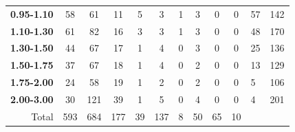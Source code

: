 \begin{table}
\begin{tabular}{r|cccccccccll}
\textbf{0.95-1.10}    & 58                          & 61                          & 11                          & 5                        & 3                          & 1                          & 3                          & 0                        & 0                          & 57                   & 142   \\
\textbf{1.10-1.30}    & 61                          & 82                          & 16                          & 3                        & 3                          & 1                          & 3                          & 0                        & 0                          & 48                   & 170   \\
\textbf{1.30-1.50}    & 44                          & 67                          & 17                          & 1                        & 4                          & 0                          & 3                          & 0                        & 0                          & 25                   & 136   \\
\textbf{1.50-1.75}    & 37                          & 67                          & 18                          & 1                        & 4                          & 0                          & 2                          & 0                        & 0                          & 13                   & 129   \\
\textbf{1.75-2.00}    & 24                          & 58                          & 19                          & 1                        & 2                          & 0                          & 2                          & 0                        & 0                          & 5                    & 106   \\
\textbf{2.00-3.00}    & 30                          & 121                         & 39                          & 1                        & 5                          & 0                          & 4                          & 0                        & 0                          & 4                    & 201   \\ \hline
Total                 & 593                         & 684                         & 177                         & 39                       & 137                        & 8                          & 50                         & 65                       & 10                         & \multicolumn{1}{c}{} &      
\end{tabular}
\end{table}


